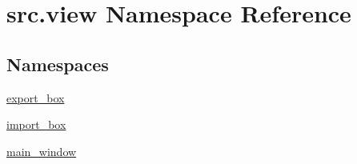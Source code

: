 \hypertarget{namespacesrc_1_1view}{}\section{src.\+view Namespace Reference}
\label{namespacesrc_1_1view}
\subsection*{Namespaces}
\begin{DoxyCompactItemize}
\item 
 \hyperlink{namespacesrc_1_1view_1_1export__box}{export\+\_\+box}
\item 
 \hyperlink{namespacesrc_1_1view_1_1import__box}{import\+\_\+box}
\item 
 \hyperlink{namespacesrc_1_1view_1_1main__window}{main\+\_\+window}
\end{DoxyCompactItemize}

